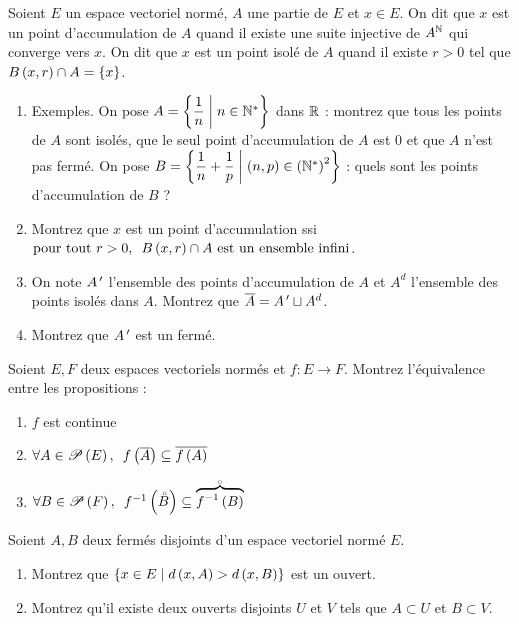 \begin{exoss}[Exercice 18]
Soient \(E\) un espace vectoriel normé, \(A\) une partie de \(E\) et \(x\in E\). On dit que \(x\) est un point d'accumulation de \(A\) quand il existe une suite injective de \(A^{\mathbb{N}}\) qui converge vers \(x\). On dit que \(x\) est un point isolé de \(A\) quand il existe \(r>0\) tel que \(B\left(x,r\right)\cap A=\left\lbrace x\right\rbrace\).

\begin{enumerate}
    \item Exemples. On pose \(A=\left\lbrace\dfrac{1}{n}\;\middle|\; n\in\mathbb{N}^*\right\rbrace\) dans \(\mathbb{R}\) : montrez que tous les points de \(A\) sont isolés, que le seul point d'accumulation de \(A\) est \(0\) et que \(A\) n'est pas fermé. On pose \(B=\left\lbrace\dfrac{1}{n}+\dfrac{1}{p}\;\middle|\;\left(n,p\right)\in\left(\mathbb{N}^*\right)^2\right\rbrace\) : quels sont les points d'accumulation de \(B\) ? \\
    \item Montrez que \(x\) est un point d'accumulation ssi \(\quantifs{\tpt r>0}\bouleo{x}{r}\inter A\text{ est un ensemble infini}\). \\
    \item On note \(A^{\,\prime}\) l'ensemble des points d'accumulation de \(A\) et \(A^d\) l'ensemble des points isolés dans \(A\). Montrez que \(\overline{A}=A^{\,\prime}\sqcup A^d\). \\
    \item Montrez que \(A^{\,\prime}\) est un fermé.
\end{enumerate}
\end{exoss}



\begin{exoss}[Exercice 19]
Soient \(E,F\) deux espaces vectoriels normés et \(f:E\to F\). Montrez l'équivalence entre les propositions :

\begin{enumerate}
    \item \(f\) est continue \\
    \item \(\quantifs{\forall A\in\P{E}}f\paren{\conj{A}}\subset\conj{f\paren{A}}\) \\
    \item \(\quantifs{\forall B\in\P{F}}f\inv\paren{\interieur{B}}\subset\interieur{\overbrace{f\inv\paren{B}}}\)
\end{enumerate}
\end{exoss}



\begin{exopss}[Exercice 20]
Soient \(A,B\) deux fermés disjoints d'un espace vectoriel normé \(E\).

\begin{enumerate}
    \item Montrez que \(\left\lbrace x\in E\;\middle|\; d\left(x,A\right)>d\left(x,B\right)\right\rbrace\) est un ouvert. \\
    \item Montrez qu'il existe deux ouverts disjoints \(U\) et \(V\) tels que \(A\subset U\) et \(B\subset V\).
\end{enumerate}
\end{exopss}



